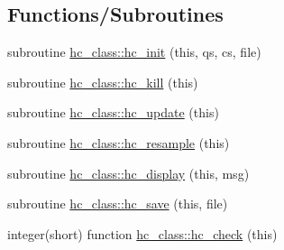 \subsection*{Functions/\+Subroutines}
\begin{DoxyCompactItemize}
\item 
subroutine \hyperlink{namespacehc__class_a6a95655090afaac2c5f7b049c3919597}{hc\+\_\+class\+::hc\+\_\+init} (this, qs, cs, file)
\item 
subroutine \hyperlink{namespacehc__class_a72759d56fe1bbe360bfe0efaae62b6a6}{hc\+\_\+class\+::hc\+\_\+kill} (this)
\item 
subroutine \hyperlink{namespacehc__class_a5b4008b35ac8a501909a4b9aed8fcd71}{hc\+\_\+class\+::hc\+\_\+update} (this)
\item 
subroutine \hyperlink{namespacehc__class_a1b4a0d9a46c63f538c74670dca5fdc82}{hc\+\_\+class\+::hc\+\_\+resample} (this)
\item 
subroutine \hyperlink{namespacehc__class_a484af233bb8b65db73534ae297fa7346}{hc\+\_\+class\+::hc\+\_\+display} (this, msg)
\item 
subroutine \hyperlink{namespacehc__class_ac1fbe6abcc3415c55bd2b920cbb47234}{hc\+\_\+class\+::hc\+\_\+save} (this, file)
\item 
integer(short) function \hyperlink{namespacehc__class_ad0b55c92720ef59cfd8b4cecd194afe1}{hc\+\_\+class\+::hc\+\_\+check} (this)
\end{DoxyCompactItemize}
